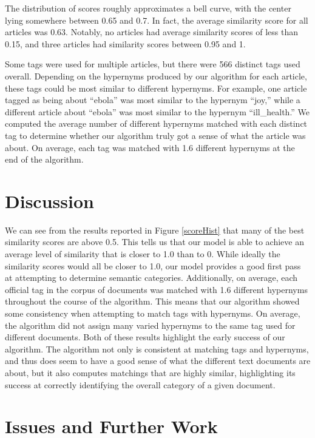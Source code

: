 \documentclass[12pt]{article}
\begin{document}
The distribution of scores roughly approximates a bell curve, with the center lying somewhere between 0.65 and 0.7. In fact, the average similarity score for all articles was 0.63. Notably, no articles had average similarity scores of less than 0.15, and three articles had similarity scores between 0.95 and 1.

Some tags were used for multiple articles, but there were 566 distinct tags used overall. Depending on the hypernyms produced by our algorithm for each article, these tags could be most similar to different hypernyms. For example, one article tagged as being about ``ebola'' was most similar to the hypernym ``joy,'' while a different article about ``ebola'' was most similar to the hypernym ``ill\_health.'' We computed the average number of different hypernyms matched with each distinct tag to determine whether our algorithm truly got a sense of what the article was about. On average, each tag was matched with 1.6 different hypernyms at the end of the algorithm.

\section{Discussion}

We can see from the results reported in Figure \ref{scoreHist} that many of the best similarity scores are above 0.5. This tells us that our model is able to achieve an average level of similarity that is closer to 1.0 than to 0. While ideally the similarity scores would all be closer to 1.0, our model provides a good first pass at attempting to determine semantic categories. Additionally, on average, each official tag in the corpus of documents was matched with 1.6 different hypernyms throughout the course of the algorithm. This means that our algorithm showed some consistency when attempting to match tags with hypernyms. On average, the algorithm did not assign many varied hypernyms to the same tag used for different documents. Both of these results highlight the early success of our algorithm. The algorithm not only is consistent at matching tags and hypernyms, and thus does seem to have a good sense of what the different text documents are about, but it also computes matchings that are highly similar, highlighting its success at correctly identifying the overall category of a given document.

\section{Issues and Further Work}
\end{document}
